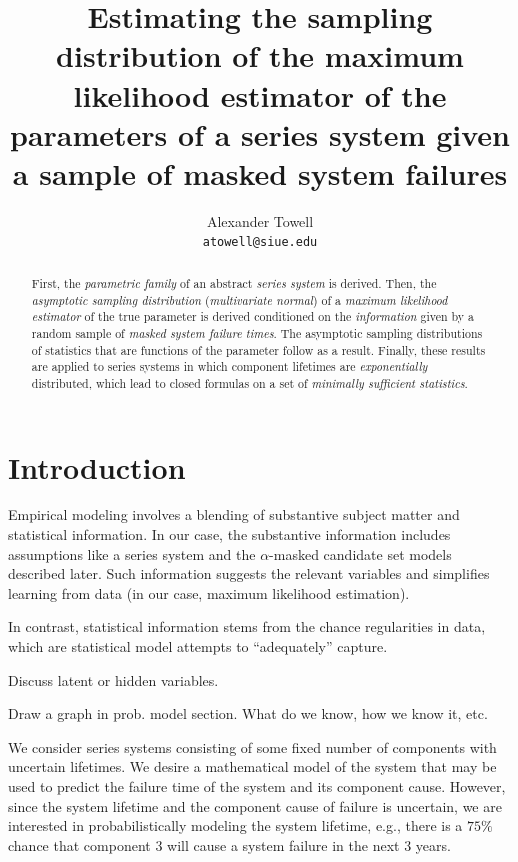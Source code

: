 \documentclass[
    11pt,
    extrafontsizes,
    article,
    oldfontcommands,
    final,
    oneside,
    openany,
    hidelinks]{memoir}
\title{Estimating the sampling distribution of the maximum likelihood estimator of the parameters of a series system given a sample of masked system failures}
\author{Alexander Towell\\\texttt{atowell@siue.edu}}
\date{}
\begin{document}
\maketitle

\begin{abstract}
First, the \emph{parametric family} of an abstract \emph{series system} is derived. Then, the \emph{asymptotic sampling distribution} (\emph{multivariate normal}) of a \emph{maximum likelihood estimator} of the true parameter is derived conditioned on the \emph{information} given by a random sample of \emph{masked system failure times}. The asymptotic sampling distributions of statistics that are functions of the parameter follow as a result. Finally, these results are applied to series systems in which component lifetimes are \emph{exponentially} distributed, which lead to closed formulas on a set of \emph{minimally sufficient statistics}.
\end{abstract}

\tableofcontents

\chapter{Introduction}
\label{sec:intro}
Empirical modeling involves a blending of substantive subject matter and statistical information.
In our case, the substantive information includes assumptions like a series system and the $\alpha$-masked candidate set models described later.
Such information suggests the relevant variables and simplifies learning from data (in our case, maximum likelihood estimation).

In contrast, statistical information stems from the chance regularities in data, which are statistical model attempts to ``adequately'' capture.


Discuss latent or hidden variables.

Draw a graph in prob. model section. What do we know, how we know it, etc.


We consider series systems consisting of some fixed number of components with 
uncertain lifetimes. We desire a mathematical model of the system that may be 
used to predict the failure time of the system and its component cause. 
However, since the system lifetime and the component cause of failure is 
uncertain, we are interested in probabilistically modeling the system lifetime, 
e.g., there is a $75\%$ chance that component $3$ will cause a system failure 
in the next $3$ years.
\end{document}
